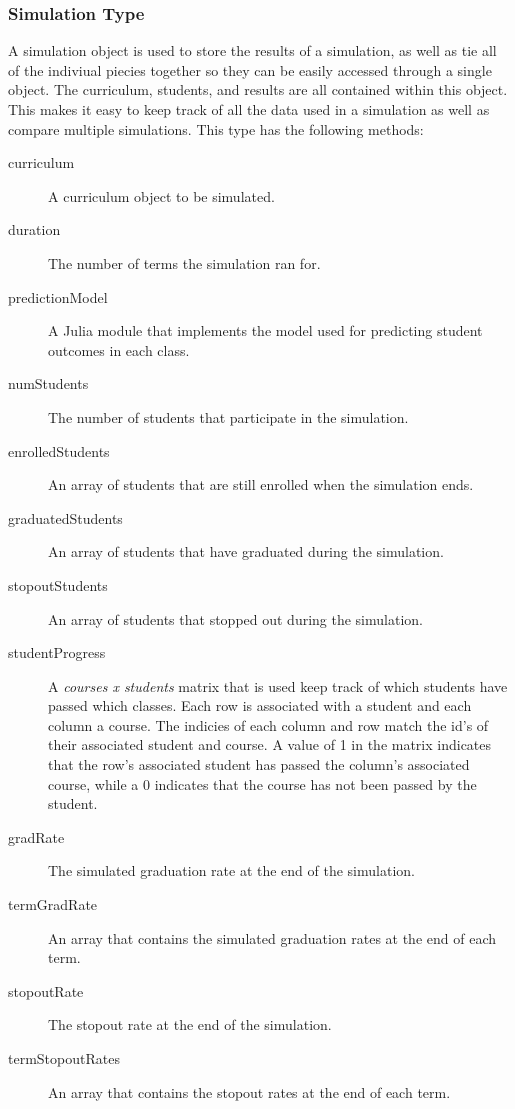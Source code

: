 \documentclass[botnum, fleqn]{unmeethesis}
\begin{document}
\subsubsection{Simulation Type}
A simulation object is used to store the results of a simulation, as well as tie all of the indiviual piecies together so they can be easily accessed through a single object. The curriculum, students, and results are all contained within this object. This makes it easy to keep track of all the data used in a simulation as well as compare multiple simulations. This type has the following methods:

\begin{description}
\item [curriculum] A curriculum object to be simulated.
\item [duration] The number of terms the simulation ran for.
\item [predictionModel] A Julia module that implements the model used for predicting student outcomes in each class.
\item [numStudents] The number of students that participate in the simulation.
\item [enrolledStudents] An array of students that are still enrolled when the simulation ends.
\item [graduatedStudents] An array of students that have graduated during the simulation.
\item [stopoutStudents] An array of students that stopped out during the simulation.
\item [studentProgress] A \textit{courses x students} matrix that is used keep track of which students have passed which classes. Each row is associated with a student and each column a course. The indicies of each column and row match the id's of their associated student and course. A value of 1 in the matrix indicates that the row's associated student has passed the column's associated course, while a 0 indicates that the course has not been passed by the student.
\item [gradRate] The simulated graduation rate at the end of the simulation.
\item [termGradRate] An array that contains the simulated graduation rates at the end of each term.
\item [stopoutRate] The stopout rate at the end of the simulation.
\item [termStopoutRates] An array that contains the stopout rates at the end of each term.
\end{description}
\end{document}
